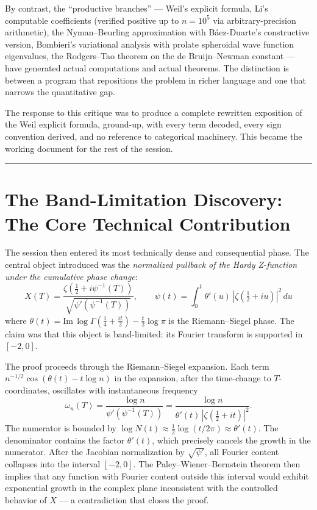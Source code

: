 \documentclass[12pt]{article}
\begin{document}
By contrast, the ``productive branches'' --- Weil's explicit formula, Li's computable
coefficients (verified positive up to $n = 10^5$ via arbitrary-precision arithmetic),
the Nyman--Beurling approximation with B\'{a}ez-Duarte's constructive version, Bombieri's
variational analysis with prolate spheroidal wave function eigenvalues, the Rodgers--Tao
theorem on the de Bruijn--Newman constant --- have generated actual computations and
actual theorems. The distinction is between a program that repositions the problem in
richer language and one that narrows the quantitative gap.

The response to this critique was to produce a complete rewritten exposition of the
Weil explicit formula, ground-up, with every term decoded, every sign convention
derived, and no reference to categorical machinery. This became the working document for
the rest of the session.

\bigskip
\hrule
\bigskip

\section{The Band-Limitation Discovery: The Core Technical Contribution}

The session then entered its most technically dense and consequential phase. The central
object introduced was the \textit{normalized pullback of the Hardy Z-function under the
cumulative phase change}:
\[
    X(T)
    = \frac{\zeta\!\left(\tfrac{1}{2} + i\psi^{-1}(T)\right)}
           {\sqrt{\psi'\!\left(\psi^{-1}(T)\right)}},
    \qquad
    \psi(t) = \int_0^t \theta'(u)\,|\zeta(\tfrac{1}{2}+iu)|^2\,du
\]
where $\theta(t) = \mathrm{Im}\,\log\Gamma(\tfrac{1}{4}+\tfrac{it}{2})
- \tfrac{t}{2}\log\pi$ is the Riemann--Siegel phase. The claim was that this object is
band-limited: its Fourier transform is supported in $[-2,0]$.

The proof proceeds through the Riemann--Siegel expansion. Each term
$n^{-1/2} \cos(\theta(t) - t\log n)$ in the expansion, after the time-change to
$T$-coordinates, oscillates with instantaneous frequency
\[
    \omega_n(T)
    = \frac{\log n}{\psi'(\psi^{-1}(T))}
    = \frac{\log n}{\theta'(t)\,|\zeta(\tfrac{1}{2}+it)|^2}.
\]
The numerator is bounded by $\log N(t) \approx \tfrac{1}{2}\log(t/2\pi)
\approx \theta'(t)$. The denominator contains the factor $\theta'(t)$, which precisely
cancels the growth in the numerator. After the Jacobian normalization by $\sqrt{\psi'}$,
all Fourier content collapses into the interval $[-2,0]$. The Paley--Wiener--Bernstein
theorem then implies that any function with Fourier content outside this interval would
exhibit exponential growth in the complex plane inconsistent with the controlled behavior
of $X$ --- a contradiction that closes the proof.
\end{document}
